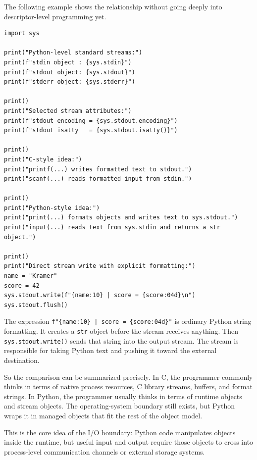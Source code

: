 The following example shows the relationship without going deeply into descriptor-level programming yet.

\begin{verbatim}
import sys

print("Python-level standard streams:")
print(f"stdin object : {sys.stdin}")
print(f"stdout object: {sys.stdout}")
print(f"stderr object: {sys.stderr}")

print()
print("Selected stream attributes:")
print(f"stdout encoding = {sys.stdout.encoding}")
print(f"stdout isatty   = {sys.stdout.isatty()}")

print()
print("C-style idea:")
print("printf(...) writes formatted text to stdout.")
print("scanf(...) reads formatted input from stdin.")

print()
print("Python-style idea:")
print("print(...) formats objects and writes text to sys.stdout.")
print("input(...) reads text from sys.stdin and returns a str object.")

print()
print("Direct stream write with explicit formatting:")
name = "Kramer"
score = 42
sys.stdout.write(f"{name:10} | score = {score:04d}\n")
sys.stdout.flush()
\end{verbatim}

The expression \texttt{f"\{name:10\} | score = \{score:04d\}"} is ordinary Python string formatting. It creates a \texttt{str} object before the stream receives anything. Then \texttt{sys.stdout.write()} sends that string into the output stream. The stream is responsible for taking Python text and pushing it toward the external destination.

So the comparison can be summarized precisely. In C, the programmer commonly thinks in terms of native process resources, C library streams, buffers, and format strings. In Python, the programmer usually thinks in terms of runtime objects and stream objects. The operating-system boundary still exists, but Python wraps it in managed objects that fit the rest of the object model.

This is the core idea of the I/O boundary: Python code manipulates objects inside the runtime, but useful input and output require those objects to cross into process-level communication channels or external storage systems.